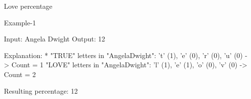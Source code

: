 \begin{tutorial}{Love percentage}

Example-1

​Input: Angela Dwight
​Output: 12

​Explanation: * "TRUE" letters in "AngelaDwight": 't' (1), 'e' (0), 'r' (0), 'u' (0) -> Count = 1
​"LOVE" letters in "AngelaDwight": 'l' (1), 'e' (1), 'o' (0), 'v' (0) -> Count = 2

​Resulting percentage: 12%

\end{tutorial}
